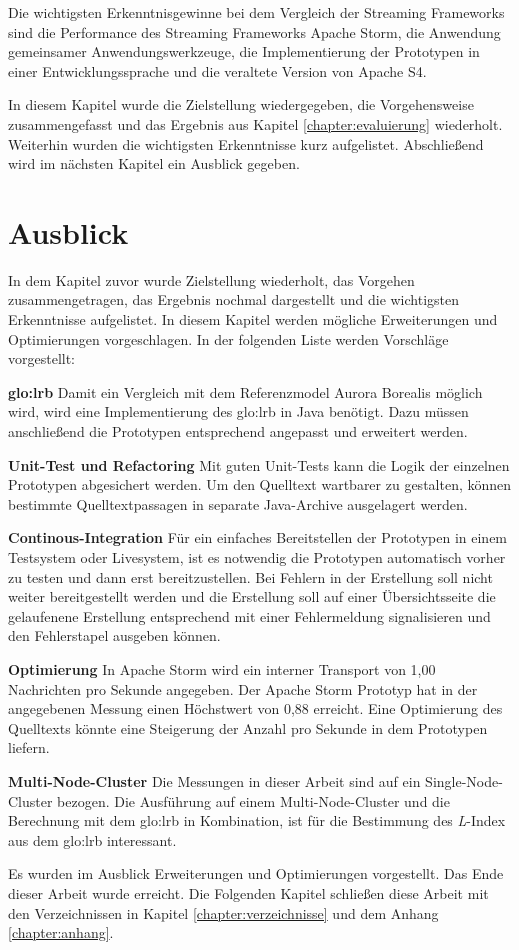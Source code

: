 Die wichtigsten Erkenntnisgewinne bei dem Vergleich der Streaming Frameworks sind die Performance des Streaming Frameworks Apache Storm, die Anwendung gemeinsamer Anwendungswerkzeuge, die Implementierung der Prototypen in einer Entwicklungssprache und die veraltete Version von Apache S4.

In diesem Kapitel wurde die Zielstellung wiedergegeben, die Vorgehensweise zusammengefasst und das Ergebnis aus Kapitel \ref{chapter:evaluierung} wiederholt. Weiterhin wurden die wichtigsten Erkenntnisse kurz aufgelistet. Abschließend wird im nächsten Kapitel ein Ausblick gegeben.


\section{Ausblick}

In dem Kapitel zuvor wurde Zielstellung wiederholt, das Vorgehen zusammengetragen, das Ergebnis nochmal dargestellt und die wichtigsten Erkenntnisse aufgelistet. In diesem Kapitel werden mögliche Erweiterungen und Optimierungen vorgeschlagen. In der folgenden Liste werden Vorschläge vorgestellt:

\textbf{\gls{glo:lrb}}
Damit ein Vergleich mit dem Referenzmodel Aurora Borealis möglich wird, wird eine Implementierung des \gls{glo:lrb} in Java benötigt. Dazu müssen anschließend die Prototypen entsprechend angepasst und erweitert werden.

\textbf{Unit-Test und Refactoring}
Mit guten Unit-Tests kann die Logik der einzelnen Prototypen abgesichert werden. Um den Quelltext wartbarer zu gestalten, können bestimmte Quelltextpassagen in separate Java-Archive ausgelagert werden.

\textbf{Continous-Integration}
Für ein einfaches Bereitstellen der Prototypen in einem Testsystem oder Livesystem, ist es notwendig die Prototypen automatisch vorher zu testen und dann erst bereitzustellen. Bei Fehlern in der Erstellung soll nicht weiter bereitgestellt werden und die Erstellung soll auf einer Übersichtsseite die gelaufenene Erstellung entsprechend mit einer Fehlermeldung signalisieren und den Fehlerstapel ausgeben können.

\textbf{Optimierung}
In Apache Storm wird ein interner Transport von 1,00 Nachrichten pro Sekunde angegeben. Der Apache Storm Prototyp hat in der angegebenen Messung einen Höchstwert von 0,88 erreicht. Eine Optimierung des Quelltexts könnte eine Steigerung der Anzahl pro Sekunde in dem Prototypen liefern.

\textbf{Multi-Node-Cluster}
Die Messungen in dieser Arbeit sind auf ein Single-Node-Cluster bezogen. Die Ausführung auf einem Multi-Node-Cluster und die Berechnung mit dem \gls{glo:lrb} in Kombination, ist für die Bestimmung des \textit{L}-Index aus dem \gls{glo:lrb} interessant.

Es wurden im Ausblick Erweiterungen und Optimierungen vorgestellt. Das Ende dieser Arbeit wurde erreicht. Die Folgenden Kapitel schließen diese Arbeit mit den Verzeichnissen in Kapitel \ref{chapter:verzeichnisse} und dem Anhang \ref{chapter:anhang}.


